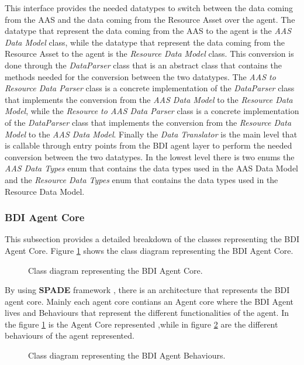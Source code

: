 This interface provides the needed datatypes to switch between the data coming from the AAS and the data coming from the Resource Asset over the agent.
The datatype that represent the data coming from the AAS to the agent is the \emph{AAS Data Model} class, while the datatype that represent the data coming from the Resource Asset to the agent is the \emph{Resource Data Model} class.
This conversion is done through the \emph{DataParser} class that is an abstract class that contains the methods needed for the conversion between the two datatypes.
The \emph{AAS to Resource Data Parser} class is a concrete implementation of the \emph{DataParser} class that implements the conversion from the \emph{AAS Data Model} to the \emph{Resource Data Model}, while the \emph{Resource to AAS Data Parser} class is a concrete implementation of the \emph{DataParser} class that implements the conversion from the \emph{Resource Data Model} to the \emph{AAS Data Model}.
Finally the \emph{Data Translator} is the main level that is callable through entry points from the BDI agent layer to perform the needed conversion between the two datatypes.
In the lowest level there is two enums  the \emph{AAS Data Types} enum that contains the data types used in the AAS Data Model and the \emph{Resource Data Types} enum that contains the data types used in the Resource Data Model.

\newpage
\subsubsection{BDI Agent Core}
This subsection provides a detailed breakdown of the classes representing the BDI Agent Core.
Figure \ref{fig:bdi_agent_core_classes} shows the class diagram representing the BDI Agent Core.
\begin{figure}[ht]
    \centering
    
    \caption{Class diagram representing the BDI Agent Core.}
    \label{fig:bdi_agent_core_classes}
\end{figure}

By using \textbf{SPADE} framework , there is an architecture that represents the BDI agent core.
Mainly each agent core contians an Agent core where the BDI Agent lives and Behaviours that represent the different functionalities of the agent.
In the figure \ref{fig:bdi_agent_core_classes} is the Agent Core represented ,while in figure \ref{fig:bdi_agent_behaviours_classes} are the different behaviours of the agent represented.
\begin{figure}[ht]
    \centering
    
    \caption{Class diagram representing the BDI Agent Behaviours.}
    \label{fig:bdi_agent_behaviours_classes}
\end{figure}

